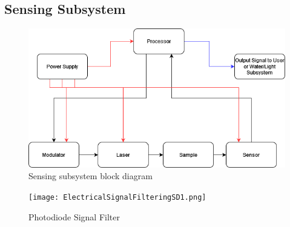 \subsection{Sensing Subsystem}
\begin{figure}[H]
    \caption{Sensing subsystem block diagram}
    \centering
    \includegraphics[width=\textwidth]{images/IRSensorBlockDiagram.png}
\end{figure}

\begin{figure}[H]
    \caption{Photodiode Signal Filter}
    \centering
    \texttt{[image: ElectricalSignalFilteringSD1.png]}
\end{figure}